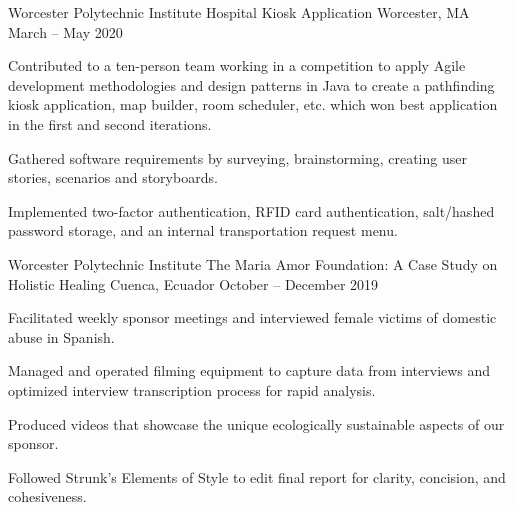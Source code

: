 

\begin{cventries}

  \cventry
    {Worcester Polytechnic Institute} %
    {Hospital Kiosk Application } %
    {Worcester, MA} %
    {March – May 2020} %
    {
      \begin{cvitems} %
       \item {Contributed to a ten-person team working in a competition to apply Agile development methodologies and
        design patterns in Java to create a pathfinding kiosk application, map builder, room scheduler, etc. which won best application in the first and second iterations.}
        \item {Gathered software requirements by surveying, brainstorming, creating user stories, scenarios and storyboards.}
        \item {Implemented two-factor authentication, RFID card authentication, salt/hashed password storage, and an internal transportation request menu.}
      \end{cvitems}
    }


  \cventry
    {Worcester Polytechnic Institute} %
    {The Maria Amor Foundation: A Case Study on Holistic Healing} %
    {Cuenca, Ecuador} %
    {October – December 2019} %
    {
      \begin{cvitems} %
        \item {Facilitated weekly sponsor meetings and interviewed female victims of domestic abuse in Spanish.}
        \item {Managed and operated filming equipment to capture data from
        interviews and optimized interview transcription process for rapid analysis.}
        \item {Produced videos that showcase the unique ecologically sustainable aspects of our sponsor.}
        \item {Followed
        Strunk’s Elements of Style to edit final report for clarity, concision, and cohesiveness.}
      \end{cvitems}
    }

\end{cventries}
